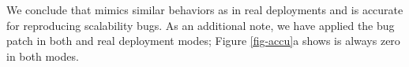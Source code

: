 


We conclude that \sck mimics similar behaviors as in real deployments and
is accurate for reproducing scalability bugs.
%
As an additional note, we have applied the bug patch in both \sck and real
deployment modes;  Figure \ref{fig-accu}a shows \flaps is always zero in
both modes.



